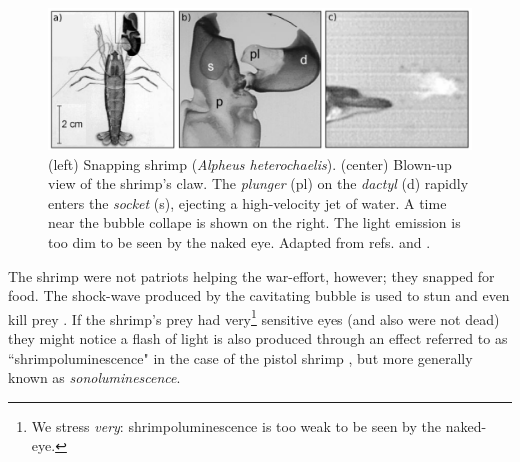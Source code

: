 \documentclass[rmp,aps,nofootinbib,superscriptaddress,floatfix]{revtex4-2}
\begin{document}
\begin{figure}
\includegraphics[width=0.95\linewidth]{figs/shrimp.pdf}
    \caption{(left) Snapping shrimp (\emph{Alpheus heterochaelis}). (center) Blown-up view of the shrimp's claw. The \emph{plunger} (pl) on the \emph{dactyl} (d) rapidly enters the \emph{socket} (s), ejecting a high-velocity jet of water. A time near the bubble collape is shown on the right. The light emission is too dim to be seen by the naked eye. Adapted from refs. \cite{versluis2000snapping} and \cite{lohse2001snapping}.}
\label{fig:shrimp}
\end{figure}

The shrimp were not patriots helping the war-effort, however; they snapped for food. The shock-wave produced by the cavitating bubble is used to stun and even kill prey \cite{versluis2000snapping}. If the shrimp's prey had very\footnote{We stress \emph{very}: shrimpoluminescence is too weak to be seen by the naked-eye.} sensitive eyes (and also were not dead) they might notice a flash of light is also produced through an effect referred to as ``shrimpoluminescence" in the case of the pistol shrimp \cite{lohse2001snapping}, but more generally known as \emph{sonoluminescence}.
\end{document}
